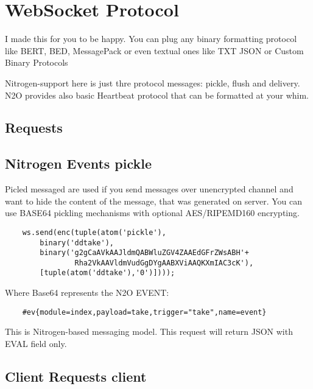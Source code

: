 \section{WebSocket Protocol}

I made this for you to be happy.
You can plug any binary formatting protocol like BERT, BED, MessagePack
or even textual ones like TXT JSON or Custom Binary Protocols

Nitrogen-support here is just thre protocol messages: pickle, flush and delivery.
N2O provides also basic Heartbeat protocol that can be formatted at your whim.

\subsection*{Requests}

\subsection{Nitrogen Events {\bf pickle}}

Picled messaged are used if you send messages over unencrypted
channel and want to hide the content of the message,
that was generated on server. You can use BASE64 pickling mechanisms
with optional AES/RIPEMD160 encrypting.

\vspace{1\baselineskip}
\begin{lstlisting}
    ws.send(enc(tuple(atom('pickle'),
        binary('ddtake'),
        binary('g2gCaAVkAAJldmQABWluZGV4ZAAEdGFrZWsABH'+
                Rha2VkAAVldmVudGgDYgAABXViAAQKXmIAC3cK'),
        [tuple(atom('ddtake'),'0')])));
\end{lstlisting}
\vspace{1\baselineskip}

Where Base64 represents the N2O EVENT:

\vspace{1\baselineskip}
\begin{lstlisting}
    #ev{module=index,payload=take,trigger="take",name=event}
\end{lstlisting}
\vspace{1\baselineskip}

This is Nitrogen-based messaging model.
This request will return JSON with EVAL field only.

\subsection{Client Requests {\bf client}}

